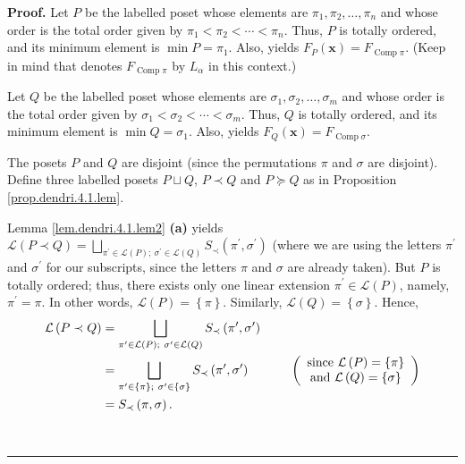 \documentclass[numbers=enddot,12pt,final,onecolumn,notitlepage]{scrartcl}%
\theoremstyle{definition}
\newenvironment{proof}[1][Proof]{\noindent\textbf{#1.} }{\ \rule{0.5em}{0.5em}}
\newenvironment{verlong}{}{}
\begin{document}
\begin{verlong}
\begin{proof}
Let $P$ be the labelled poset whose elements are $\pi_{1},\pi_{2},\ldots
,\pi_{n}$ and whose order is the total order given by $\pi_{1}<\pi_{2}%
<\cdots<\pi_{n}$. Thus, $P$ is totally ordered, and its minimum element is
$\min P=\pi_{1}$. Also, \cite[Proposition 5.2.10]{HopfComb} yields
$F_{P}\left(  \mathbf{x}\right)  =F_{\operatorname*{Comp}\pi}$. (Keep in mind
that \cite[Proposition 5.2.10]{HopfComb} denotes $F_{\operatorname*{Comp}\pi}$
by $L_{\alpha}$ in this context.)

Let $Q$ be the labelled poset whose elements are $\sigma_{1},\sigma_{2}%
,\ldots,\sigma_{m}$ and whose order is the total order given by $\sigma
_{1}<\sigma_{2}<\cdots<\sigma_{m}$. Thus, $Q$ is totally ordered, and its
minimum element is $\min Q=\sigma_{1}$. Also, \cite[Proposition 5.2.10]%
{HopfComb} yields $F_{Q}\left(  \mathbf{x}\right)  =F_{\operatorname*{Comp}%
\sigma}$.

The posets $P$ and $Q$ are disjoint (since the permutations $\pi$ and $\sigma$
are disjoint). Define three labelled posets $P\sqcup Q$, $P\left.
\prec\right.  Q$ and $P\left.  \succeq\right.  Q$ as in Proposition
\ref{prop.dendri.4.1.lem}.

Lemma \ref{lem.dendri.4.1.lem2} \textbf{(a)} yields $\mathcal{L}\left(
P\left.  \prec\right.  Q\right)  =\bigsqcup_{\pi^{\prime}\in\mathcal{L}\left(
P\right)  ;\ \sigma^{\prime}\in\mathcal{L}\left(  Q\right)  }S_{\prec}\left(
\pi^{\prime},\sigma^{\prime}\right)  $ (where we are using the letters
$\pi^{\prime}$ and $\sigma^{\prime}$ for our subscripts, since the letters
$\pi$ and $\sigma$ are already taken). But $P$ is totally ordered; thus, there
exists only one linear extension $\pi^{\prime}\in\mathcal{L}\left(  P\right)
$, namely, $\pi^{\prime}=\pi$. In other words, $\mathcal{L}\left(  P\right)
=\left\{  \pi\right\}  $. Similarly, $\mathcal{L}\left(  Q\right)  =\left\{
\sigma\right\}  $. Hence,%
\begin{align}
\mathcal{L}\left(  P\left.  \prec\right.  Q\right)    & =\bigsqcup
_{\pi^{\prime}\in\mathcal{L}\left(  P\right)  ;\ \sigma^{\prime}\in
\mathcal{L}\left(  Q\right)  }S_{\prec}\left(  \pi^{\prime},\sigma^{\prime
}\right) \nonumber\\
&  =\bigsqcup_{\pi^{\prime}\in\left\{  \pi\right\}  ;\ \sigma^{\prime
}\in\left\{  \sigma\right\}  }S_{\prec}\left(  \pi^{\prime},\sigma^{\prime
}\right)  \ \ \ \ \ \ \ \ \ \ \left(
\begin{array}
[c]{c}%
\text{since }\mathcal{L}\left(  P\right)  =\left\{  \pi\right\}  \\
\text{and }\mathcal{L}\left(  Q\right)  =\left\{  \sigma\right\}
\end{array}
\right)  \nonumber\\
& =S_{\prec}\left(  \pi,\sigma\right)  .\label{pf.cor.dendri.4.1.L1}%
\end{align}



\end{proof}
\end{verlong}
\end{document}
